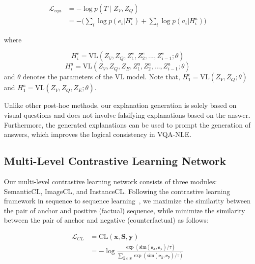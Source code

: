 \documentclass[letterpaper]{article} %
\begin{document}
\begin{equation}\label{COT_loss}
	\begin{split}
		\mathcal{L}_{vqa}&=- \log p \left({T} \mid Z_V,Z_Q \right)\\
		&= - \Big(\sum\nolimits_i \log p(e_{i} | H^e_i) + \sum\nolimits_i \log p(a_{i} | H^a_i) \Big)
	\end{split}
\end{equation}

where

\begin{equation*}\label{hidden_e}
	H^e_i= \text{VL}(Z_V,Z_Q,Z^e_1,Z^e_2,...,Z^e_{i-1};\theta)
\end{equation*}
\begin{equation*}\label{hidden_a}
	H^a_i= \text{VL}(Z_V,Z_Q,Z_E,Z^a_1,Z^a_2,...,Z^a_{i-1};\theta)
\end{equation*}
and $\theta$ denotes the parameters of the VL model. Note that, $H^e_1=\text{VL}(Z_V,Z_Q;\theta)$  and $H^a_1=\text{VL}(Z_V,Z_Q,Z_E;\theta)$.

Unlike other post-hoc methods, our explanation generation is solely based on visual questions and does not involve falsifying explanations based on the answer. Furthermore, the generated explanations can be used to prompt the generation of answers, which improves the logical consistency in VQA-NLE.

\subsection{Multi-Level Contrastive Learning Network}
Our multi-level contrastive learning network consists of three modules: SemanticCL, ImageCL, and InstanceCL. Following the contrastive learning framework in sequence to sequence learning~\cite{lee2020contrastive}, we maximize the similarity between the pair of anchor and positive (factual) sequence, while minimize the similarity between the pair of anchor and negative (counterfactual) as follows:

\begin{equation}
	\begin{split}
		\mathcal{L}_{CL}&=\text{CL}(\mathbf{x},\mathbf{S},\mathbf{y})\\
		&=- \log \frac{\exp \left(\text{sim}\left(\mathbf{e_x}, \mathbf{e_y}\right) / \tau\right)}{\sum_{\mathbf{\hat{x}}\in \mathbf{S}} \exp \left( \text{sim}\left(\mathbf{e_{\hat{x}}}, \mathbf{e_y}  \right) / \tau\right)}
	\end{split}
\end{equation}
\end{document}
